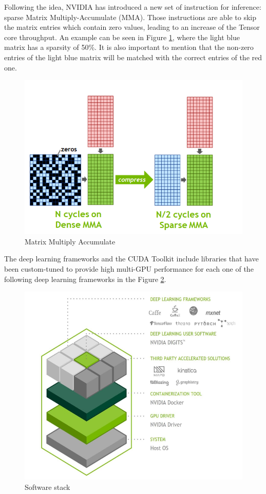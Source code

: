 Following the idea, NVIDIA has introduced a new set of instruction for inference: sparse Matrix Multiply-Accumulate (MMA). Those instructions are able to skip the matrix entries which contain zero values, leading to an increase of the Tensor core throughput. An example can be seen in Figure \ref{fig:mma}, where the light blue matrix has a sparsity of 50\%. It is also important to mention that the non-zero entries of the light blue matrix will be matched with the correct entries of the red one.
\begin{figure}[!htbp]
\centering
\captionsetup{justification=centering}
\includegraphics[scale=0.3]{./figure/mma.png}
\caption{Matrix Multiply Accumulate \cite{paper:41}}
\label{fig:mma}
\end{figure}

\newpage
The deep learning frameworks and the CUDA Toolkit include libraries that have been custom-tuned to provide high multi-GPU performance for each one of the following deep learning frameworks in the Figure \ref{fig:swtesla}.

\begin{figure}[!htbp]
\centering
\captionsetup{justification=centering}
\includegraphics[scale=0.6]{./figure/sw_stack_tesla.PNG}
\caption{Software stack \cite{paper:41}}
\label{fig:swtesla}
\end{figure}

